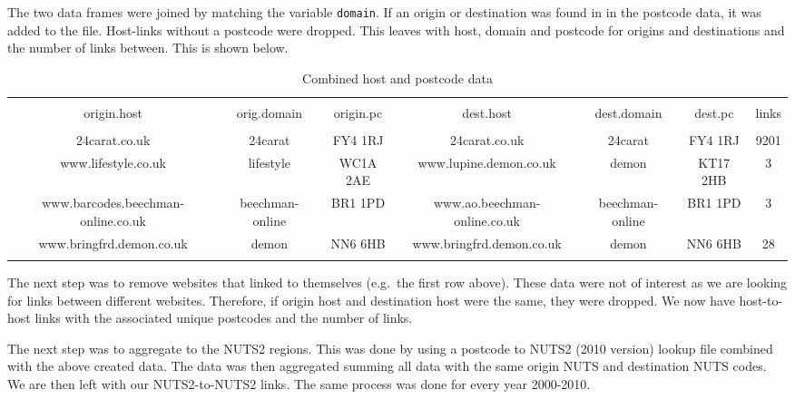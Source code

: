 \documentclass[
]{article}
\begin{document}
The two data frames were joined by matching the variable
\texttt{domain}. If an origin or destination was found in in the
postcode data, it was added to the file. Host-links without a postcode
were dropped. This leaves with host, domain and postcode for origins and
destinations and the number of links between. This is shown below.

\begin{table}[!htbp] \centering 
  \caption{Combined host and postcode data\label{combined}} 
  \label{} 
\tiny 
\begin{tabular}{@{\extracolsep{0pt}} ccccccc} 
\\[-1.8ex]\hline 
\hline \\[-1.8ex] 
origin.host & orig.domain & origin.pc & dest.host & dest.domain & dest.pc & links \\ 
\hline \\[-1.8ex] 
24carat.co.uk & 24carat & FY4 1RJ & 24carat.co.uk & 24carat & FY4 1RJ & 9201 \\ 
www.lifestyle.co.uk & lifestyle & WC1A 2AE & www.lupine.demon.co.uk & demon & KT17 2HB & 3 \\ 
www.barcodes.beechman-online.co.uk & beechman-online & BR1 1PD & www.ao.beechman-online.co.uk & beechman-online & BR1 1PD & 3 \\ 
www.bringfrd.demon.co.uk & demon & NN6 6HB & www.bringfrd.demon.co.uk & demon & NN6 6HB & 28 \\ 
\hline \\[-1.8ex] 
\end{tabular} 
\end{table}

The next step was to remove websites that linked to themselves (e.g.~the
first row above). These data were not of interest as we are looking for
links between different websites. Therefore, if origin host and
destination host were the same, they were dropped. We now have
host-to-host links with the associated unique postcodes and the number
of links.

The next step was to aggregate to the NUTS2 regions. This was done by
using a postcode to NUTS2 (2010 version) lookup file combined with the
above created data. The data was then aggregated summing all data with
the same origin NUTS and destination NUTS codes. We are then left with
our NUTS2-to-NUTS2 links. The same process was done for every year
2000-2010.
\end{document}
